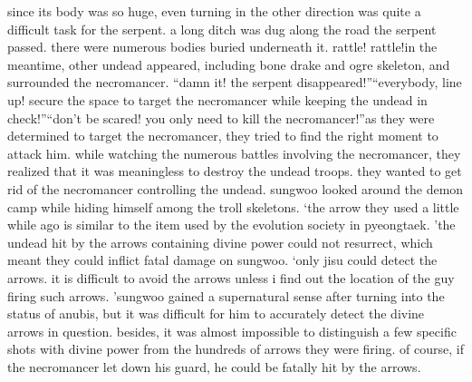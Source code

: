 since its body was so huge, even turning in the other direction was quite a difficult task for the serpent.
a long ditch was dug along the road the serpent passed.
 there were numerous bodies buried underneath it.
rattle! rattle!in the meantime, other undead appeared, including bone drake and ogre skeleton, and surrounded the necromancer.
“damn it! the serpent disappeared!”“everybody, line up! secure the space to target the necromancer while keeping the undead in check!”“don’t be scared! you only need to kill the necromancer!”as they were determined to target the necromancer, they tried to find the right moment to attack him.
 while watching the numerous battles involving the necromancer, they realized that it was meaningless to destroy the undead troops.
 they wanted to get rid of the necromancer controlling the undead.
sungwoo looked around the demon camp while hiding himself among the troll skeletons.
‘the arrow they used a little while ago is similar to the item used by the evolution society in pyeongtaek.
’the undead hit by the arrows containing divine power could not resurrect, which meant they could inflict fatal damage on sungwoo.
‘only jisu could detect the arrows.
 it is difficult to avoid the arrows unless i find out the location of the guy firing such arrows.
’sungwoo gained a supernatural sense after turning into the status of anubis, but it was difficult for him to accurately detect the divine arrows in question.
besides, it was almost impossible to distinguish a few specific shots with divine power from the hundreds of arrows they were firing.
of course, if the necromancer let down his guard, he could be fatally hit by the arrows.


